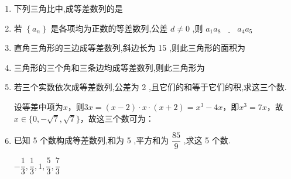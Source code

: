 \begin{enumerate}
\begin{jieda}
        所以 ${a}_{n} = \dfrac{1}{{4n} - 2}$ .
    \end{jieda}

    \item 下列三角比中,成等差数列的是
    
    \item 若 $\left\{  {a}_{n}\right\}$ 是各项均为正数的等差数列,公差 $d \neq  0$ ,则 $a_1a_8\underline{\quad\quad}a_4a_5$
    \item 直角三角形的三边成等差数列,斜边长为 15 ,则此三角形的面积为
    \item 三角形的三个角和三条边均成等差数列,则此三角形为
    


    \item 若三个实数依次成等差数列,公差为 2 ,且它们的和等于它们的积,求这三个数.
    \begin{jieda}
        设等差中项为$x$，则$3x = (x-2)\cdot x \cdot (x+2) = x^3 - 4x$，即$x^3 = 7x$，故$x \in \{0, -\sqrt{7}, \sqrt{7}\}$，故这三个数可为：
    \end{jieda}
    
    \item 已知 5 个数构成等差数列,和为 5 ,平方和为 $\dfrac{85}{9}$ ,求这 5 个数.
    \begin{jieda}
        $-\dfrac{1}{3}, \dfrac{1}{3}, 1, \dfrac{5}{3}, \dfrac{7}{3}$
    \end{jieda}


\end{enumerate}
